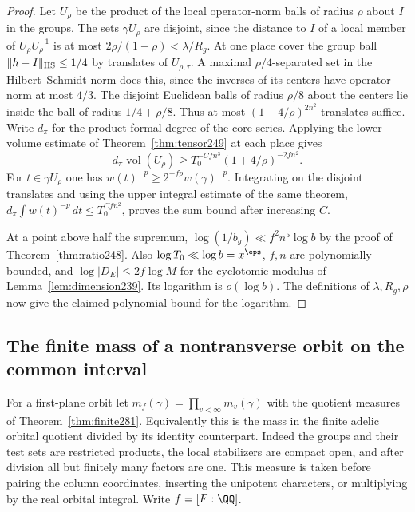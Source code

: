 \documentclass[a4paper,11pt]{article}
\theoremstyle{definition}
\theoremstyle{remark}
\numberwithin{equation}{section}
\begin{document}
\begin{proof}
Let \(U_\rho\) be the product of the local operator-norm
balls of radius \(\rho\) about \(I\) in the groups. The
sets \(\gamma U_\rho\) are disjoint, since the distance to
\(I\) of a local member of \(U_\rho U_\rho^{-1}\) is at most
\(2\rho/(1-\rho)<\lambda/R_g\).
At one place cover the group ball
\(\|h-I\|_{\rm HS}\le1/4\) by translates of \(U_{\rho,\tau}\).
A maximal \(\rho/4\)-separated set in the Hilbert--Schmidt
norm does this, since the inverses of its centers have
operator norm at most \(4/3\). The disjoint Euclidean balls
of radius \(\rho/8\) about the centers lie inside the ball of
radius \(1/4+\rho/8\). Thus at most
\((1+4/\rho)^{2n^2}\) translates suffice. Write \(d_\pi\)
for the product formal degree of the core series. Applying
the lower volume estimate of Theorem~\ref{thm:tensor249} at
each place gives
\[
 d_\pi\operatorname{vol}(U_\rho)
       \ge T_0^{-Cfn^3}(1+4/\rho)^{-2fn^2}.
\]
For \(t\in\gamma U_\rho\) one has
\(w(t)^{-p}\ge2^{-fp}w(\gamma)^{-p}\). Integrating on the
disjoint translates and using the upper integral estimate of
the same theorem, \(d_\pi\int w(t)^{-p}\,dt\le T_0^{Cfn^2}\),
proves the sum bound after increasing \(C\).

At a point above half the supremum,
\(\log(1/b_g)\ll f^2n^5\log b\) by the proof of
Theorem~\ref{thm:ratio248}. Also \(\log T_0\ll\log b=x^\eps\),
\(f,n\) are polynomially bounded, and
\(\log|D_E|\le2f\log M\) for the cyclotomic modulus of
Lemma~\ref{lem:dimension239}. Its logarithm is \(o(\log b)\).
The definitions of \(\lambda,R_g,\rho\) now give the claimed
polynomial bound for the logarithm.
\end{proof}

\subsection{The finite mass of a nontransverse orbit on the common interval}\label{nav:IX-48}
For a first-plane orbit let \(m_f(\gamma)=\prod_{v<\infty}
m_v(\gamma)\) with the quotient measures of
Theorem~\ref{thm:finite281}. Equivalently this is the mass in
the finite adelic orbital quotient divided by its identity
counterpart. Indeed the groups and their test sets are
restricted products, the local stabilizers are compact open,
and after division all but finitely many factors are one.
This measure is taken before pairing the column coordinates,
inserting the unipotent characters, or multiplying by the
real orbital integral. Write \(f=[F:\QQ]\).
\end{document}
